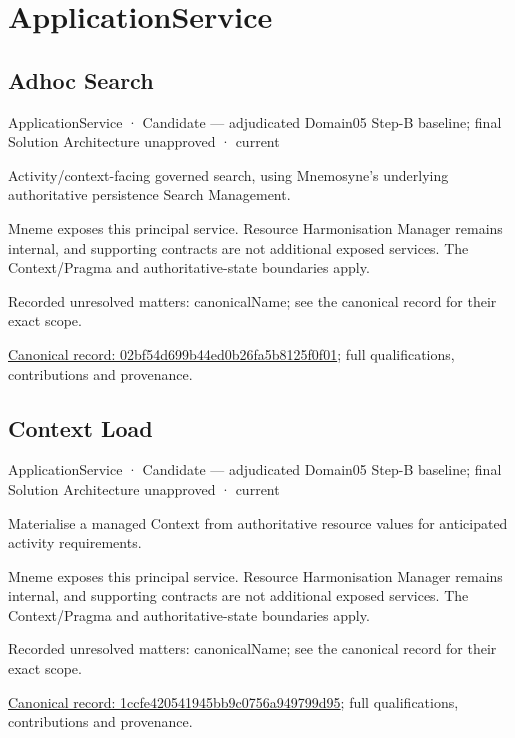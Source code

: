 \section{ApplicationService}

\subsection{Adhoc Search}

\label{element:02bf54d699b44ed0b26fa5b8125f0f01}
{\small ApplicationService · Candidate — adjudicated Domain05 Step-B baseline; final Solution Architecture unapproved · current}\par

Activity/context-facing governed search, using Mnemosyne's underlying authoritative persistence Search Management.



Mneme exposes this principal service. Resource Harmonisation Manager remains internal, and supporting contracts are not additional exposed services. The Context/Pragma and authoritative-state boundaries apply.


{\small Recorded unresolved matters: canonicalName; see the canonical record for their exact scope.}\par
{\footnotesize \href{../../../../continuum/application/application-service/02bf54d699b44ed0b26fa5b8125f0f01.md}{Canonical record: 02bf54d699b44ed0b26fa5b8125f0f01}; full qualifications, contributions and provenance.}\par
\subsection{Context Load}

\label{element:1ccfe420541945bb9c0756a949799d95}
{\small ApplicationService · Candidate — adjudicated Domain05 Step-B baseline; final Solution Architecture unapproved · current}\par

Materialise a managed Context from authoritative resource values for anticipated activity requirements.



Mneme exposes this principal service. Resource Harmonisation Manager remains internal, and supporting contracts are not additional exposed services. The Context/Pragma and authoritative-state boundaries apply.


{\small Recorded unresolved matters: canonicalName; see the canonical record for their exact scope.}\par
{\footnotesize \href{../../../../continuum/application/application-service/1ccfe420541945bb9c0756a949799d95.md}{Canonical record: 1ccfe420541945bb9c0756a949799d95}; full qualifications, contributions and provenance.}\par
